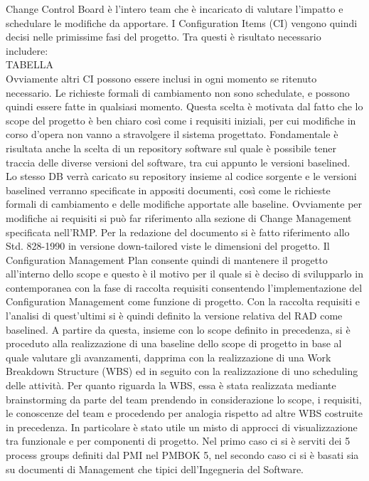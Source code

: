 Change Control Board è l’intero team che è incaricato di valutare l’impatto e schedulare le modifiche da apportare.
I Configuration Items (CI) vengono quindi decisi nelle primissime fasi del progetto. Tra questi è risultato necessario includere: 
\\
TABELLA
\\
Ovviamente altri CI possono essere inclusi in ogni momento se ritenuto necessario.
Le richieste formali di cambiamento non sono schedulate, e possono quindi essere fatte in qualsiasi momento. Questa scelta è motivata dal fatto che lo scope del progetto è ben chiaro così come i requisiti iniziali, per cui modifiche in corso d’opera non vanno a stravolgere il sistema progettato.
Fondamentale è risultata anche la scelta di un repository software sul quale è possibile tener traccia delle diverse versioni del software, tra cui appunto le versioni baselined. Lo stesso DB verrà caricato su repository insieme al codice sorgente e le versioni baselined verranno specificate in appositi documenti, così come le richieste formali di cambiamento e delle modifiche apportate alle baseline.
Ovviamente per modifiche ai requisiti si può far riferimento alla sezione di Change Management specificata nell’RMP.
Per la redazione del documento si è fatto riferimento allo Std. 828-1990 in versione down-tailored viste le dimensioni del progetto.
Il Configuration Management Plan consente quindi di mantenere il progetto all’interno dello scope e questo è il motivo per il quale si è deciso di svilupparlo in contemporanea con la fase di raccolta requisiti consentendo l’implementazione del Configuration Management come funzione di progetto.
Con la raccolta requisiti e l’analisi di quest’ultimi si è quindi definito la versione relativa del RAD come baselined.
A partire da questa, insieme con lo scope definito in precedenza, si è proceduto alla realizzazione di una baseline dello scope di progetto in base al quale valutare gli avanzamenti, dapprima con la realizzazione di una Work Breakdown Structure (WBS) ed in seguito con la realizzazione di uno scheduling delle attività.
Per quanto riguarda la WBS, essa è stata realizzata mediante brainstorming da parte del team prendendo in considerazione lo scope, i requisiti, le conoscenze del team e procedendo per analogia rispetto ad altre WBS costruite in precedenza.
In particolare è stato utile un misto di approcci di visualizzazione tra funzionale e per componenti di progetto. Nel primo caso ci si è serviti dei 5 process groups definiti dal PMI nel PMBOK 5, nel secondo caso ci si è basati sia su documenti di Management che tipici dell’Ingegneria del Software.
